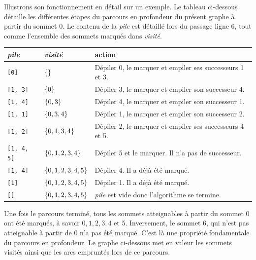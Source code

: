 \documentclass{magnolia}
\begin{document}
Illustrons son fonctionnement en détail sur un exemple. Le tableau ci-dessous détaille
les différentes étapes du parcours en profondeur du présent graphe à partir du sommet 0.
Le contenu de la \emph{pile} est détaillé lors du passage ligne 6, tout comme
l'ensemble des sommets marqués dans \emph{visité}.

\begin{center}
\begin{tabular}{l|l|l}
\emph{pile} & \emph{visité} & action\\
\hline
\verb_[0]_ & $\left\{\right\}$  & Dépiler 0, le marquer et empiler ses successeurs 1 et 3.\\
\verb_[1, 3]_ & $\left\{0\right\}$ & Dépiler 3, le marquer et empiler son successeur 4.\\
\verb_[1, 4]_ & $\left\{0, 3\right\}$ & Dépiler 4, le marquer et empiler son successeur 1.\\
\verb_[1, 1]_ & $\left\{0, 3, 4\right\}$ & Dépiler 1, le marquer et empiler son successeur 2.\\
\verb_[1, 2]_ & $\left\{0, 1, 3, 4\right\}$ & Dépiler 2, le marquer et empiler ses successeurs 4 et 5.\\
\verb_[1, 4, 5]_ & $\left\{0, 1, 2, 3, 4\right\}$ & Dépiler 5 et le marquer. Il n'a pas de successeur.\\
\verb_[1, 4]_ & $\left\{0, 1, 2, 3, 4, 5\right\}$ & Dépiler 4. Il a déjà été marqué.\\
\verb_[1]_ & $\left\{0, 1, 2, 3, 4, 5\right\}$ & Dépiler 1. Il a déjà été marqué.\\
\verb_[]_ & $\left\{0, 1, 2, 3, 4, 5\right\}$ & \emph{pile} est vide donc l'algorithme se termine.
\end{tabular}
\end{center}
Une fois le parcours terminé, tous les sommets atteignables à partir du sommet 0 ont été
marqués, à savoir $0, 1, 2, 3, 4$ et 5. Inversement, le sommet 6, qui n'est pas atteignable
à partir de 0 n'a pas été marqué. C'est là une propriété fondamentale du parcours en
profondeur. Le graphe ci-dessous met en valeur les sommets visités ainsi que les
arcs empruntés lors de ce parcours.
\end{document}
